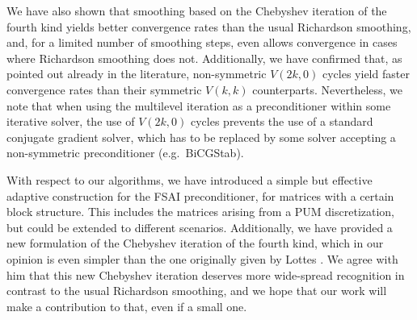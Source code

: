 \documentclass[a4paper]{article}
\theoremstyle{plain}
\theoremstyle{definition}
\theoremstyle{remark}
\begin{document}
We have also shown that smoothing based on the Chebyshev iteration of the fourth kind yields better convergence rates than the usual Richardson smoothing, and, for a limited number of smoothing steps, even allows convergence in cases where Richardson smoothing does not. Additionally, we have confirmed that, as pointed out already in the literature, non-symmetric \(V(2k,0)\) cycles yield faster convergence rates than their symmetric \(V(k,k)\) counterparts. Nevertheless, we note that when using the multilevel iteration as a preconditioner within some iterative solver, the use of \(V(2k,0)\) cycles prevents the use of a standard conjugate gradient solver, which has to be replaced by some solver accepting a non-symmetric preconditioner (e.g.\ BiCGStab).

With respect to our algorithms, we have introduced a simple but effective adaptive construction for the FSAI preconditioner, for matrices with a certain block structure. This includes the matrices arising from a PUM discretization, but could be extended to different scenarios. Additionally, we have provided a new formulation of the Chebyshev iteration of the fourth kind, which in our opinion is even simpler than the one originally given by Lottes \cite{Lottes2023}. We agree with him that this new Chebyshev iteration deserves more wide-spread recognition in contrast to the usual Richardson smoothing, and we hope that our work will make a contribution to that, even if a small one.




\end{document}
